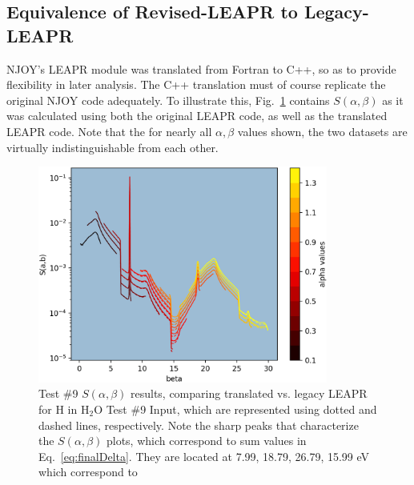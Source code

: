 \documentclass[Master.tex]{subfiles}
\begin{document}
  \subsection{Equivalence of Revised-LEAPR to Legacy-LEAPR}
    NJOY's LEAPR module was translated from Fortran to C++, so as to provide flexibility in later analysis. The C++ translation must of course replicate the original NJOY code adequately. To illustrate this, Fig.~\ref{fig:me_vs_njoy_sab} contains $S(\alpha,\beta)$ as it was calculated using both the original LEAPR code, as well as the translated LEAPR code. Note that the for nearly all $\alpha,\beta$ values shown, the two datasets are virtually indistinguishable from each other. 
    \begin{figure}[H]
      \begin{center}
        \includegraphics[width=0.85\textwidth]{images/me-vs-njoy-1c}
        \caption[Comparison of Translated vs. Legacy LEAPR, for Test \#9 ($S(\alpha,\beta)$)]{Test \#9 $S(\alpha,\beta)$ results, comparing translated vs. legacy LEAPR for H in H$_2$O Test \#9 Input, which are represented using dotted and dashed lines, respectively. Note the sharp peaks that characterize the $S(\alpha,\beta)$ plots, which correspond to sum values in Eq.~\ref{eq:finalDelta}. They are located at 7.99, 18.79, 26.79, 15.99 eV which correspond to  }
        \label{fig:me_vs_njoy_sab}
      \end{center}
    \end{figure}
\end{document}
